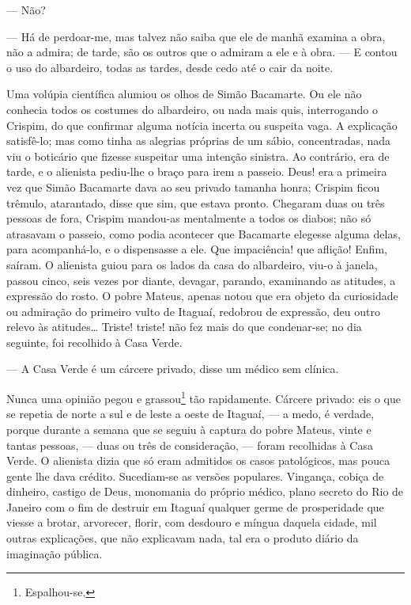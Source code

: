 --- Não?

--- Há de perdoar-me, mas talvez não saiba que ele de manhã examina a
obra, não a admira; de tarde, são os outros que o admiram a ele e à
obra. --- E contou o uso do albardeiro, todas as tardes, desde cedo até
o cair da noite.

Uma volúpia científica alumiou os olhos de Simão Bacamarte. Ou ele não
conhecia todos os costumes do albardeiro, ou nada mais quis,
interrogando o Crispim, do que confirmar alguma notícia incerta ou
suspeita vaga. A explicação satisfê-lo; mas como tinha as alegrias
próprias de um sábio, concentradas, nada viu o boticário que fizesse
suspeitar uma intenção sinistra. Ao contrário, era de tarde, e o
alienista pediu-lhe o braço para irem a passeio. Deus! era a primeira
vez que Simão Bacamarte dava ao seu privado tamanha honra; Crispim ficou
trêmulo, atarantado, disse que sim, que estava pronto. Chegaram duas ou
três pessoas de fora, Crispim mandou-as mentalmente a todos os diabos;
não só atrasavam o passeio, como podia acontecer que Bacamarte elegesse
alguma delas, para acompanhá-lo, e o dispensasse a ele. Que impaciência!
que aflição! Enfim, saíram. O alienista guiou para os lados da casa do
albardeiro, viu-o à janela, passou cinco, seis vezes por diante,
devagar, parando, examinando as atitudes, a expressão do rosto. O pobre
Mateus, apenas notou que era objeto da curiosidade ou admiração do
primeiro vulto de Itaguaí, redobrou de expressão, deu outro relevo às
atitudes\ldots{} Triste! triste! não fez mais do que condenar-se; no dia
seguinte, foi recolhido à Casa Verde.

--- A Casa Verde é um cárcere privado, disse um médico sem clínica.

Nunca uma opinião pegou e grassou\footnote{Espalhou-se.} tão
rapidamente. Cárcere privado: eis o que se repetia de norte a sul e de
leste a oeste de Itaguaí, --- a medo, é verdade, porque durante a semana
que se seguiu à captura do pobre Mateus, vinte e tantas pessoas, ---
duas ou três de consideração, --- foram recolhidas à Casa Verde. O
alienista dizia que só eram admitidos os casos patológicos, mas pouca
gente lhe dava crédito. Sucediam-se as versões populares. Vingança,
cobiça de dinheiro, castigo de Deus, monomania do próprio médico, plano
secreto do Rio de Janeiro com o fim de destruir em Itaguaí qualquer
germe de prosperidade que viesse a brotar, arvorecer, florir, com
desdouro e míngua daquela cidade, mil outras explicações, que não
explicavam nada, tal era o produto diário da imaginação pública.

